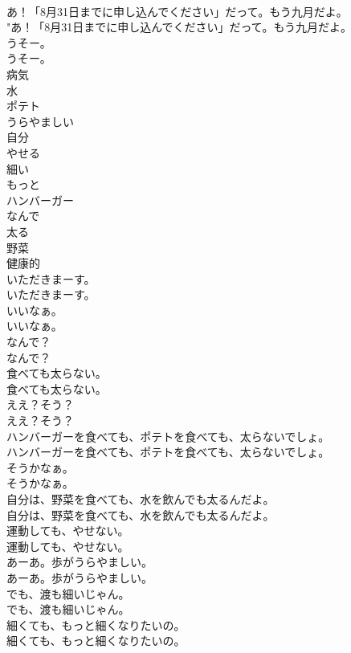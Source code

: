 \documentclass[8pt]{extreport}
\begin{document}
\begin{CJK}{UTF8}{min}
\\	あ！「8月31日までに申し込んでください」だって。もう九月だよ。	
\\	"あ！「8月31日までに申し込んでください」だって。もう九月だよ。 
\\	うそー。	
\\	うそー。 
\\	病気
\\	水
\\	ポテト
\\	うらやましい
\\	自分
\\	やせる
\\	細い
\\	もっと
\\	ハンバーガー
\\	なんで
\\	太る
\\	野菜
\\	健康的
\\	いただきまーす。	
\\	いただきまーす。 
\\	いいなぁ。	
\\	いいなぁ。 
\\	なんで？	
\\	なんで？ 
\\	食べても太らない。	
\\	食べても太らない。 
\\	ええ？そう？	
\\	ええ？そう？ 
\\	ハンバーガーを食べても、ポテトを食べても、太らないでしょ。	
\\	ハンバーガーを食べても、ポテトを食べても、太らないでしょ。 
\\	そうかなぁ。	
\\	そうかなぁ。 
\\	自分は、野菜を食べても、水を飲んでも太るんだよ。	
\\	自分は、野菜を食べても、水を飲んでも太るんだよ。 
\\	運動しても、やせない。	
\\	運動しても、やせない。 
\\	あーあ。歩がうらやましい。	
\\	あーあ。歩がうらやましい。 
\\	でも、渡も細いじゃん。	
\\	でも、渡も細いじゃん。 
\\	細くても、もっと細くなりたいの。	
\\	細くても、もっと細くなりたいの。 

\end{CJK}
\end{document}
